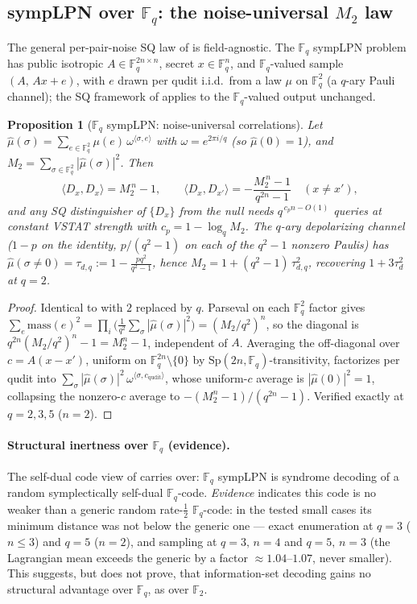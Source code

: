 \documentclass[11pt,a4paper]{article}
\theoremstyle{plain}
\newtheorem{proposition}[theorem]{Proposition}
\theoremstyle{definition}
\newcommand{\F}{\mathbb{F}}
\begin{document}
\subsection{sympLPN over $\F_q$: the noise-universal $M_2$ law}
\label{subsec:fq-symplpn}

The general per-pair-noise SQ law of  is field-agnostic. The $\F_q$ sympLPN problem has public isotropic $A \in \F_q^{2n\times n}$, secret $x\in\F_q^n$, and $\F_q$-valued sample $(A,\,Ax+e)$, with $e$ drawn per qudit i.i.d.\ from a law $\mu$ on $\F_q^2$ (a $q$-ary Pauli channel); the SQ framework of \cite{FGR+17} applies to the $\F_q$-valued output unchanged.

\begin{proposition}[$\F_q$ sympLPN: noise-universal correlations]
\label{prop:fq-symplpn-m2}
Let $\hat\mu(\sigma)=\sum_{e\in\F_q^2}\mu(e)\,\omega^{\langle\sigma,e\rangle}$ with $\omega=e^{2\pi i/q}$ (so $\hat\mu(0)=1$), and $M_2 = \sum_{\sigma\in\F_q^2}|\hat\mu(\sigma)|^2$. Then
\[
\langle D_x,D_x\rangle = M_2^{\,n}-1, \qquad \langle D_x,D_{x'}\rangle = -\frac{M_2^{\,n}-1}{q^{2n}-1}\quad(x\neq x'),
\]
and any SQ distinguisher of $\{D_x\}$ from the null needs $q^{\,c_p n-O(1)}$ queries at constant VSTAT strength with $c_p = 1-\log_q M_2$. The $q$-ary depolarizing channel ($1-p$ on the identity, $p/(q^2-1)$ on each of the $q^2-1$ nonzero Paulis) has $\hat\mu(\sigma\neq 0)=\tau_{d,q}:=1-\tfrac{pq^2}{q^2-1}$, hence $M_2 = 1+(q^2-1)\,\tau_{d,q}^2$, recovering $1+3\tau_d^2$ at $q=2$.
\end{proposition}

\begin{proof}
Identical to  with $2$ replaced by $q$. Parseval on each $\F_q^2$ factor gives $\sum_e \mathrm{mass}(e)^2=\prod_i\bigl(\tfrac1{q^2}\sum_\sigma|\hat\mu(\sigma)|^2\bigr)=(M_2/q^2)^n$, so the diagonal is $q^{2n}(M_2/q^2)^n-1=M_2^n-1$, independent of $A$. Averaging the off-diagonal over $c=A(x{-}x')$, uniform on $\F_q^{2n}\setminus\{0\}$ by $\mathrm{Sp}(2n,\F_q)$-transitivity, factorizes per qudit into $\sum_\sigma|\hat\mu(\sigma)|^2\,\omega^{\langle\sigma,c_{\mathrm{qudit}}\rangle}$, whose uniform-$c$ average is $|\hat\mu(0)|^2=1$, collapsing the nonzero-$c$ average to $-(M_2^n-1)/(q^{2n}-1)$. Verified exactly at $q=2,3,5$ ($n=2$).
\end{proof}

\paragraph{Structural inertness over $\F_q$ (evidence).} The self-dual code view of  carries over: $\F_q$ sympLPN is syndrome decoding of a random symplectically self-dual $\F_q$-code. \emph{Evidence} indicates this code is no weaker than a generic random rate-$\tfrac12$ $\F_q$-code: in the tested small cases its minimum distance was not below the generic one --- exact enumeration at $q=3$ ($n\le 3$) and $q=5$ ($n=2$), and sampling at $q=3,\,n=4$ and $q=5,\,n=3$ (the Lagrangian mean exceeds the generic by a factor $\approx 1.04$--$1.07$, never smaller). This suggests, but does not prove, that information-set decoding gains no structural advantage over $\F_q$, as over $\F_2$.
\label{subsec:fq-params}
\end{document}
